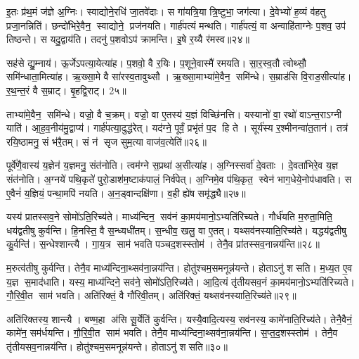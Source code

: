 इ॒तः प्र॑थ॒मं ज॑ज्ञे अ॒ग्निः। स्वाद्योने॒रधि॑ जा॒तवे॑दाः। स गा॑यत्रि॒या त्रि॒ष्टुभा॒ जग॑त्या। दे॒वेभ्यो॑ ह॒व्यं व॑हतु प्रजा॒नन्निति॑। छन्दो॑भिरे॒वैन॒ स्वाद्योने॒ प्रज॑नयति। गार्\mbox{}ह॑पत्यं मन्थति। गार्\mbox{}ह॑पत्यं॒ वा अन्वाहि॑ताग्नेः प॒शव॒ उप॑ तिष्ठन्ते। स यदु॒द्वाय॑ति। तदनु॑ प॒शवोऽप॑ क्रामन्ति। इ॒षे र॒य्यै र॑मस्व॥२४॥

सह॑से द्यु॒म्नाय॑। ऊ॒र्जेऽपत्या॒येत्या॑ह। प॒शवो॒ वै र॒यिः। प॒शूने॒वास्मै॑ रमयति। सा॒र॒स्व॒तौ त्वोथ्सौ॒ समि॑न्धाता॒मित्या॑ह। ऋ॒ख्सा॒मे वै सा॑रस्व॒तावुथ्सौ। ऋ॒ख्सा॒माभ्या॑मे॒वैन॒ समि॑न्धे। स॒म्राड॑सि वि॒राड॒सीत्या॑ह। र॒थ॒न्त॒रं वै स॒म्राट्। बृ॒हद्वि॒राट्। 2५॥

ताभ्या॑मे॒वैन॒ समि॑न्धे। वज्रो॒ वै च॒क्रम्। वज्रो॒ वा ए॒तस्य॑ य॒ज्ञं विच्छि॑नत्ति। यस्यानो॑ वा॒ रथो॑ वाऽन्त॒राऽग्नी याति॑। आ॒ह॒व॒नीय॑मु॒द्वाप्य॑। गार्\mbox{}ह॑पत्या॒दुद्ध॑रेत्। यद॑ग्ने॒ पूर्वं॒ प्रभृ॑तं प॒द हि ते। सूर्य॑स्य र॒श्मीनन्वा॑त॒तान॑। तत्र॑ रयि॒ष्ठामनु॒ सं भ॑रै॒तम्। सं न॑ सृज सुम॒त्या वाज॑व॒त्येति॑॥२६॥

पूर्वे॑णै॒वास्य॑ य॒ज्ञेन॑ य॒ज्ञमनु॒ संत॑नोति। त्वम॑ग्ने स॒प्रथा॑ अ॒सीत्या॑ह। अ॒ग्निस्सर्वा॑ दे॒वताः। दे॒वता॑भिरे॒व य॒ज्ञ संत॑नोति। अ॒ग्नये॑ पथि॒कृते॑ पुरो॒डाश॑म॒ष्टाक॑पालं॒ निर्व॑पेत्। अ॒ग्निमे॒व प॑थि॒कृत॒ स्वेन॑ भाग॒धेये॒नोप॑धावति। स ए॒वैनं॑ य॒ज्ञियं॒ पन्था॒मपि॑ नयति। अ॒न॒ड्वान्दक्षि॑णा। व॒ही ह्ये॑ष समृ॑द्ध्यै॥२७॥

यस्य॑ प्रातस्सव॒ने सोमो॑ऽति॒रिच्य॑ते। माध्य॑न्दिन॒ सव॑नं का॒मय॑मानो॒ऽभ्यति॑रिच्यते। गौर्ध॑यति म॒रुता॒मिति॒ धय॑द्वतीषु कुर्वन्ति। हि॒नस्ति॒ वै स॒न्ध्यधी॑तम्। स॒न्धीव॒ खलु॒ वा ए॒तत्। यथ्सव॑नस्याति॒रिच्य॑ते। यद्धय॑द्वतीषु कु॒र्वन्ति॑। स॒न्धेश्शान्त्यै। गा॒य॒त्र साम॑ भवति पञ्चद॒शस्स्तोम॑। तेनै॒व प्रा॑तस्सव॒नान्नय॑न्ति॥२८॥

म॒रुत्व॑तीषु कुर्वन्ति। तेनै॒व माध्य॑न्दिना॒थ्सव॑ना॒न्नय॑न्ति। होतु॑श्चम॒समनून्न॑यन्ते। होताऽनु॑ शसति। म॒ध्य॒त ए॒व य॒ज्ञ स॒माद॑धाति। यस्य॒ माध्य॑न्दिने॒ सव॑ने॒ सोमो॑ऽति॒रिच्य॑ते। आ॒दि॒त्यं तृ॑तीयसव॒नं का॒मय॑मानो॒ऽभ्यति॑रिच्यते। गौ॒रि॒वी॒त साम॑ भवति। अति॑रिक्तं॒ वै गौ॑रिवी॒तम्। अति॑रिक्तं॒ यथ्सव॑नस्याति॒रिच्य॑ते॥२९॥

अति॑रिक्तस्य॒ शान्त्यै। बण्म॒हा अ॑सि सू॒र्येति॑ कुर्वन्ति। यस्यै॒वादि॒त्यस्य॒ सव॑नस्य॒ कामे॑नाति॒रिच्य॑ते। तेनै॒वैनं॒ कामे॑न॒ सम॑र्धयन्ति। गौ॒रि॒वी॒त साम॑ भवति। तेनै॒व माध्य॑न्दिना॒थ्सव॑ना॒न्नय॑न्ति। स॒प्त॒द॒शस्स्तोम॑। तेनै॒व तृ॑तीयसव॒नान्नय॑न्ति। होतु॑श्चम॒समनून्न॑यन्ते। होताऽनु॑ शसति॥३०॥

